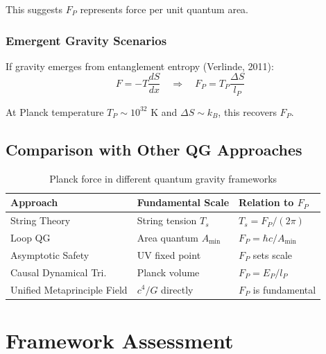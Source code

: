 This suggests $F_P$ represents force per unit quantum area.

\subsubsection{Emergent Gravity Scenarios}

If gravity emerges from entanglement entropy (Verlinde, 2011):
\begin{equation}
F = -T \frac{dS}{dx} \quad \Rightarrow \quad F_P = T_P \frac{\Delta S}{l_P}
\end{equation}

At Planck temperature $T_P \sim 10^{32}$ K and $\Delta S \sim k_B$, this recovers $F_P$.

\subsection{Comparison with Other QG Approaches}

\begin{table}[h]
\centering
\begin{tabular}{|l|l|l|}
\hline
\textbf{Approach} & \textbf{Fundamental Scale} & \textbf{Relation to $F_P$} \\
\hline
String Theory & String tension $T_s$ & $T_s = F_P/(2\pi)$ \\
Loop QG & Area quantum $A_{\text{min}}$ & $F_P = \hbar c/A_{\text{min}}$ \\
Asymptotic Safety & UV fixed point & $F_P$ sets scale \\
Causal Dynamical Tri. & Planck volume & $F_P = E_P/l_P$ \\
Unified Metaprinciple Field & $c^4/G$ directly & $F_P$ is fundamental \\
\hline
\end{tabular}
\caption{Planck force in different quantum gravity frameworks}
\end{table}

\section{Framework Assessment}


